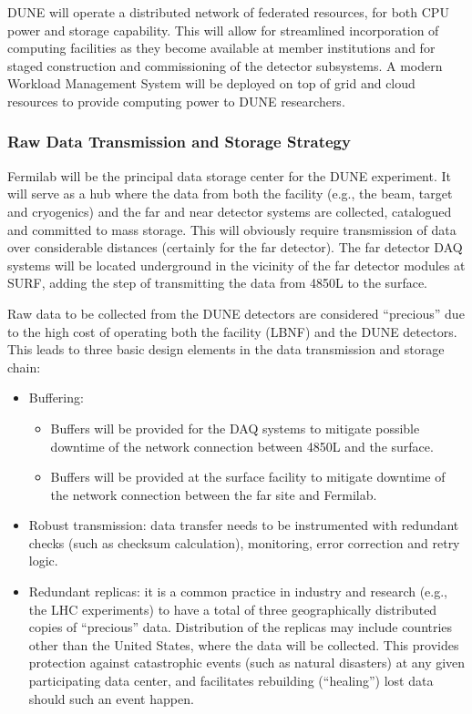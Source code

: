 DUNE will operate a distributed network of federated resources, for
both CPU power and storage capability. This will allow for streamlined
incorporation of computing facilities as they become available at
member institutions and %
for staged construction and commissioning of the detector subsystems. A
modern Workload Management System will be deployed on top of grid and
cloud resources to provide computing power to DUNE researchers.

\subsubsection{Raw Data Transmission and Storage Strategy}
Fermilab will be the principal data storage center for the DUNE experiment. It
will serve as a hub where the data from both the facility (e.g., the beam,
target and cryogenics) and the %
far and near detector systems are collected, catalogued and committed to mass
storage. This will obviously require transmission of data over
considerable distances (certainly for the far detector). %
The far detector DAQ systems %
will be located underground in the vicinity of the far detector modules at SURF, adding the %
step of transmitting the data from 4850L to the surface.

Raw data to be collected from the DUNE detectors are considered
``precious'' due to the high cost of operating both the facility (LBNF) and the DUNE detectors. %
This leads to three
basic design elements in the data transmission and storage chain:
\begin{itemize}
\item Buffering:
\begin{itemize}
\item %
Buffers will be provided for the DAQ systems to
  mitigate possible downtime of the network connection between 4850L
  and the surface.
\item Buffers will be provided at the surface facility to mitigate
  downtime of the network connection between the far site and Fermilab.
\end{itemize}
\item Robust transmission: data transfer needs to be instrumented with
  redundant checks (such as checksum calculation), monitoring, error
  correction and retry logic.
\item Redundant replicas: it is a common practice in industry and
  research (e.g., the LHC experiments) to have a total of three geographically distributed copies
  of ``precious'' data.  %
  Distribution of the replicas may include countries
  other than the United States, where the data will be collected.
  This provides protection against catastrophic events (such as
  natural disasters) at any given participating data center, %
  and facilitates rebuilding (``healing'') lost data should
  such an event happen.
\end{itemize}


